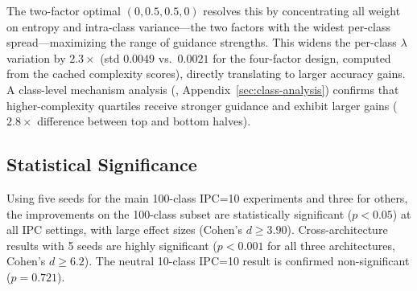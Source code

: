 The two-factor optimal $(0, 0.5, 0.5, 0)$ resolves this by concentrating all weight on entropy and intra-class variance---the two factors with the widest per-class spread---maximizing the range of guidance strengths. This widens the per-class $\lambda$ variation by $2.3\times$ (std $0.0049$ vs.\ $0.0021$ for the four-factor design, computed from the cached complexity scores), directly translating to larger accuracy gains. A class-level mechanism analysis (, Appendix~\ref{sec:class-analysis}) confirms that higher-complexity quartiles receive stronger guidance and exhibit larger gains ($2.8\times$ difference between top and bottom halves).

\subsection{Statistical Significance}
\label{sec:significance}

Using five seeds for the main 100-class IPC=10 experiments and three for others, the improvements on the 100-class subset are statistically significant ($p < 0.05$) at all IPC settings, with large effect sizes (Cohen's $d \geq 3.90$). Cross-architecture results with 5 seeds are highly significant ($p < 0.001$ for all three architectures, Cohen's $d \geq 6.2$). The neutral 10-class IPC=10 result is confirmed non-significant ($p = 0.721$).

